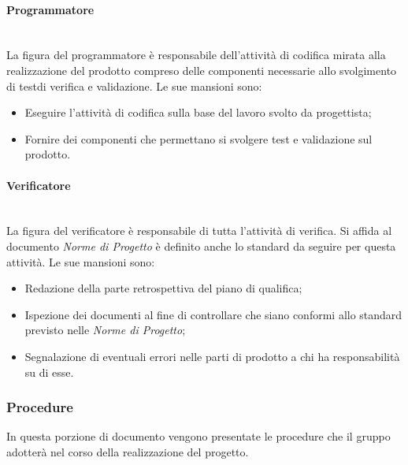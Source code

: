 			\paragraph{Programmatore}\mbox{}\\ [1mm]
				La figura del programmatore è responsabile dell'attività di codifica mirata alla realizzazione del prodotto compreso delle componenti necessarie allo svolgimento di test\glosp di verifica e validazione.
				Le sue mansioni sono:
				\begin{itemize}
					\item Eseguire l'attività di codifica sulla base del lavoro svolto da progettista;
					\item Fornire dei componenti che permettano si svolgere test e validazione sul prodotto.
				\end{itemize}
			\paragraph{Verificatore}\mbox{}\\ [1mm]
				La figura del verificatore è responsabile di tutta l'attività di verifica.
				Si affida al documento \textit{Norme di Progetto} è definito anche lo standard da seguire per questa attività.
				Le sue mansioni sono:
				\begin{itemize}
					\item Redazione della parte retrospettiva del piano di qualifica;
					\item Ispezione dei documenti al fine di controllare che siano conformi allo standard previsto nelle \textit{Norme di Progetto};
					\item Segnalazione di eventuali errori nelle parti di prodotto a chi ha responsabilità su di esse.
				\end{itemize}
		\subsubsection{Procedure}
			In questa porzione di documento vengono presentate le procedure che il gruppo adotterà nel corso della realizzazione del progetto.
